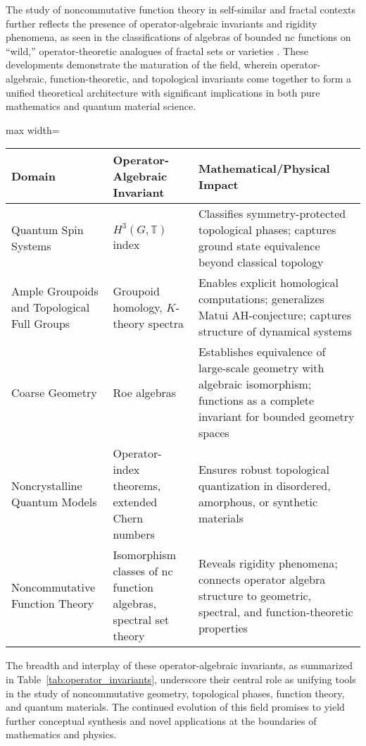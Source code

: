 The study of noncommutative function theory in self-similar and fractal contexts further reflects the presence of operator-algebraic invariants and rigidity phenomena, as seen in the classifications of algebras of bounded nc functions on ``wild,'' operator-theoretic analogues of fractal sets or varieties \cite{ref98,ref14}. These developments demonstrate the maturation of the field, wherein operator-algebraic, function-theoretic, and topological invariants come together to form a unified theoretical architecture with significant implications in both pure mathematics and quantum material science.

\begin{table*}[htbp]
\centering
\caption{Summary of Key Operator-Algebraic Invariants across Topics}
\label{tab:operator_invariants}
\begin{adjustbox}{max width=\textwidth}
\begin{tabular}{lll}
\toprule
\textbf{Domain} & \textbf{Operator-Algebraic Invariant} & \textbf{Mathematical/Physical Impact} \\
\midrule
Quantum Spin Systems     & $H^3(G, \mathbb{T})$ index & Classifies symmetry-protected topological phases; captures ground state equivalence beyond classical topology \\
Ample Groupoids and Topological Full Groups & Groupoid homology, $K$-theory spectra & Enables explicit homological computations; generalizes Matui AH-conjecture; captures structure of dynamical systems \\
Coarse Geometry         & Roe algebras              & Establishes equivalence of large-scale geometry with algebraic isomorphism; functions as a complete invariant for bounded geometry spaces \\
Noncrystalline Quantum Models & Operator-index theorems, extended Chern numbers & Ensures robust topological quantization in disordered, amorphous, or synthetic materials \\
Noncommutative Function Theory & Isomorphism classes of nc function algebras, spectral set theory & Reveals rigidity phenomena; connects operator algebra structure to geometric, spectral, and function-theoretic properties \\
\bottomrule
\end{tabular}
\end{adjustbox}
\end{table*}

The breadth and interplay of these operator-algebraic invariants, as summarized in Table~\ref{tab:operator_invariants}, underscore their central role as unifying tools in the study of noncommutative geometry, topological phases, function theory, and quantum materials. The continued evolution of this field promises to yield further conceptual synthesis and novel applications at the boundaries of mathematics and physics.

